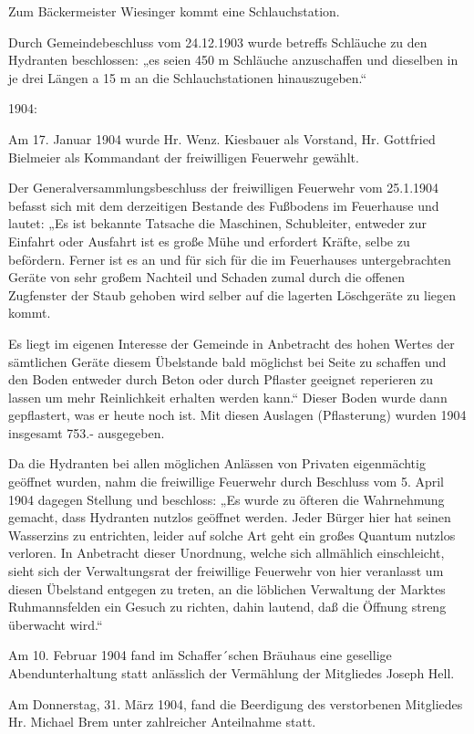 Zum Bäckermeister Wiesinger kommt eine Schlauchstation.

Durch Gemeindebeschluss vom 24.12.1903 wurde betreffs Schläuche zu den Hydranten
beschlossen: „es seien 450 m Schläuche anzuschaffen und dieselben in je drei
Längen a 15 m an die Schlauchstationen hinauszugeben.“

1904:

Am 17. Januar 1904 wurde Hr. Wenz. Kiesbauer als Vorstand, Hr. Gottfried
Bielmeier als Kommandant der freiwilligen Feuerwehr gewählt.

Der Generalversammlungsbeschluss der freiwilligen Feuerwehr vom 25.1.1904
befasst sich mit dem derzeitigen Bestande des Fußbodens im Feuerhause und
lautet: „Es ist bekannte Tatsache die Maschinen, Schubleiter, entweder zur
Einfahrt oder Ausfahrt ist es große Mühe und erfordert Kräfte, selbe zu
befördern. Ferner ist es an und für sich für die im Feuerhauses untergebrachten
Geräte von sehr großem Nachteil und Schaden zumal durch die offenen Zugfenster
der Staub gehoben wird selber auf die lagerten Löschgeräte zu liegen kommt.

Es liegt im eigenen Interesse der Gemeinde in Anbetracht des hohen Wertes der
sämtlichen Geräte diesem Übelstande bald möglichst bei Seite zu schaffen und den
Boden entweder durch Beton oder durch Pflaster geeignet reperieren zu lassen um
mehr Reinlichkeit erhalten werden kann.“ Dieser Boden wurde dann gepflastert,
was er heute noch ist. Mit diesen Auslagen (Pflasterung) wurden 1904 insgesamt
753.- ausgegeben.

Da die Hydranten bei allen möglichen Anlässen von Privaten eigenmächtig geöffnet
wurden, nahm die freiwillige Feuerwehr durch Beschluss vom 5. April 1904 dagegen
Stellung und beschloss: „Es wurde zu öfteren die Wahrnehmung gemacht, dass
Hydranten nutzlos geöffnet werden. Jeder Bürger hier hat seinen Wasserzins zu
entrichten, leider auf solche Art geht ein großes Quantum nutzlos verloren. In
Anbetracht dieser Unordnung, welche sich allmählich einschleicht, sieht sich der
Verwaltungsrat der freiwillige Feuerwehr von hier veranlasst um diesen Übelstand
entgegen zu treten, an die löblichen Verwaltung der Marktes Ruhmannsfelden ein
Gesuch zu richten, dahin lautend, daß die Öffnung streng überwacht wird.“

Am 10. Februar 1904 fand im Schaffer´schen Bräuhaus eine gesellige
Abendunterhaltung statt anlässlich der Vermählung der Mitgliedes Joseph Hell.

Am Donnerstag, 31. März 1904, fand die Beerdigung des verstorbenen Mitgliedes
Hr. Michael Brem unter zahlreicher Anteilnahme statt.

